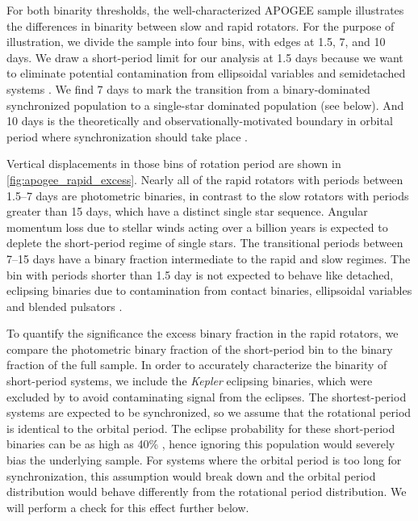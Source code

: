 \documentclass[manuscript]{aastex6}
\newcommand{\Kepler}{\mbox{\textit{Kepler}}}
\begin{document}
\begin{figure*}[htb]
    \centering
    \caption{\emph{Top Left to Bottom Right:} Vertical displacement of cool 
        APOGEE targets with \citet{McQuillan14} periods \(> 15\) days, between 
        \(7--15\) days, \(1.5--7\) days, and less than 1.5 days. Pink stars denote 
        eclipsing binaries with orbital periods within the same ranges. The 
        green and purple lines denote the inclusive and conservative 
        photometric binary thresholds, 
    respectively.}\label{fig:apogee_rapid_excess}
\end{figure*}

For both binarity thresholds, the well-characterized APOGEE sample 
illustrates the differences in binarity between slow and rapid rotators. For
the purpose of illustration, we divide the sample into four bins, with edges at 
1.5, 7, and 10 days. We draw a short-period limit for our analysis at 1.5 days 
because we want to eliminate potential contamination from ellipsoidal variables 
and semidetached systems \citep{VanEylen16}. We find 7 days to mark the
transition from a binary-dominated synchronized population to a single-star
dominated population (see below). And 10 days is the theoretically and
observationally-motivated boundary in orbital period where synchronization
should take place \citep{Claret97,Lurie17}.

Vertical displacements in those bins of rotation period are shown in
\cref{fig:apogee_rapid_excess}. Nearly all of the rapid rotators with periods 
between 1.5--7 days are photometric binaries, in contrast to the slow rotators
with periods greater than 15 days, which have a distinct single star sequence. 
Angular momentum loss due to stellar winds acting over a billion years is
expected to deplete the short-period regime of single stars. The transitional 
periods between 7--15 days have a binary fraction intermediate to the 
rapid and slow regimes. The bin with periods shorter than 1.5 day is not expected
to behave like detached, eclipsing binaries due to contamination from contact 
binaries, ellipsoidal variables and blended pulsators \citep{VanEylen16}. 

To quantify the significance the excess binary fraction in the rapid rotators, 
we compare the photometric binary fraction of the short-period bin to the
binary fraction of the full sample. In order to accurately characterize the 
binarity of short-period systems, we include the \Kepler{} eclipsing binaries, 
which were excluded by \citet{McQuillan14} to avoid contaminating signal from 
the eclipses. The shortest-period systems are expected to be synchronized, so
we assume that the rotational period is identical to the orbital period. 
The eclipse probability for these short-period binaries can be as high as 40\% 
\citep{Kirk16}, hence ignoring this population would severely
bias the underlying sample. For systems where the orbital period is too long
for synchronization, this assumption would break down and the orbital period
distribution would behave differently from the rotational period distribution.
We will perform a check for this effect further below.
\end{document}
